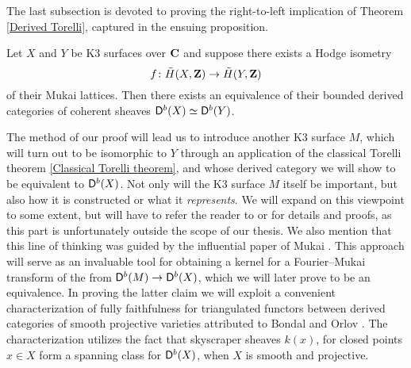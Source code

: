 The last subsection is devoted to proving the right-to-left implication of Theorem \ref{Derived Torelli}, captured in the ensuing proposition.

\begin{proposition}
    \label{Hodge isometry implies D equivalence}
    \emph{\cite[Proposition 4.2.3]{Orlov2003}}
    Let $X$ and $Y$ be K3 surfaces over $\mathbf C$ and suppose there exists a Hodge isometry 
    \[
        f \colon \,\tilde{\!{H}}(X, \mathbf Z) \to \,\tilde{\!{H}}(Y, \mathbf Z)
    \]
    of their Mukai lattices. Then there exists an equivalence of their bounded derived categories of coherent sheaves $\mathsf{D}^b(X) \simeq \mathsf{D}^b(Y)$.
\end{proposition}
The method of our proof will lead us to introduce another K3 surface $M$, which will turn out to be isomorphic to $Y$ through an application of the classical Torelli theorem \ref{Classical Torelli theorem}, and whose derived category we will show to be equivalent to $\mathsf{D}^b(X)$. Not only will the K3 surface $M$ itself be important, but also how it is constructed or what it \emph{represents}. We will expand on this viewpoint to some extent, but will have to refer the reader to \cite{HuybrechtsLehn2010} or \cite{vanBree2020} for details and proofs, as this part is unfortunately outside the scope of our thesis. We also mention that this line of thinking was guided by the influential paper of Mukai \cite{Mukai1987}. This approach will serve as an invaluable tool for obtaining a kernel for a Fourier--Mukai transform of the from $\mathsf{D}^b(M) \to \mathsf{D}^b(X)$, which we will later prove to be an equivalence. 
In proving the latter claim we will exploit a convenient characterization of fully faithfulness for triangulated functors between derived categories of smooth projective varieties attributed to Bondal and Orlov \cite{BondalOrlov1995}.  
The characterization utilizes the fact that skyscraper sheaves $k(x)$, for closed points $x \in X$ form a spanning class for $\mathsf{D}^b(X)$, when $X$ is smooth and projective. 

